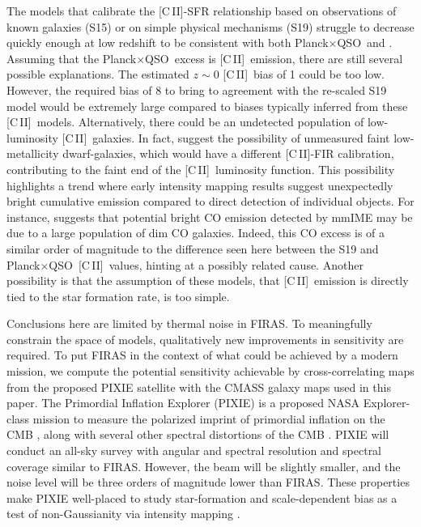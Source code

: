 \documentclass[fleqn,usenatbib]{mnras}
\newcommand{\cii}{[C{\sc\,II}]}
\newcommand{\PB}{Planck${\times}$QSO}
\begin{document}
The models that calibrate the \cii-SFR relationship based on observations of known galaxies (S15) or on simple physical mechanisms (S19) struggle to decrease quickly enough at low redshift to be consistent with both \PB\ and \cite{2017ApJ...834...36H}. Assuming that the \PB\ excess is \cii\ emission, there are still several possible explanations. The estimated $z {\sim} 0$ \cii\ bias of 1 could be too low. However, the required bias of 8 to bring \cite{2017ApJ...834...36H} to agreement with the re-scaled S19 model would be extremely large compared to biases typically inferred from these \cii\ models. Alternatively, there could be an undetected population of low-luminosity \cii\ galaxies. In fact, \cite{2017ApJ...834...36H} suggest the possibility of unmeasured faint low-metallicity dwarf-galaxies, which would have a different \cii-FIR calibration, contributing to the faint end of the \cii\ luminosity function. This possibility highlights a trend where early intensity mapping results suggest unexpectedly bright cumulative emission compared to direct detection of individual objects. For instance, \cite{2021arXiv210614904B} suggests that potential bright CO emission detected by mmIME \citep{Keating_2020} may be due to a large population of dim CO galaxies. Indeed, this CO excess is of a similar order of magnitude to the difference seen here between the S19 and \PB\ \cii\ values, hinting at a possibly related cause. Another possibility is that the assumption of these models, that \cii\ emission is directly tied to the star formation rate, is too simple.

Conclusions here are limited by thermal noise in FIRAS. To meaningfully constrain the space of models, qualitatively new improvements in sensitivity are required. To put FIRAS in the context of what could be achieved by a modern mission, we compute the potential sensitivity achievable by cross-correlating maps from the proposed PIXIE satellite with the CMASS galaxy maps used in this paper. The Primordial Inflation Explorer (PIXIE) is a proposed NASA Explorer-class mission to measure the polarized imprint of primordial inflation on the CMB \citep{kogut2011primordial}, along with several other spectral distortions of the CMB \citep{chluba2021new}. PIXIE will conduct an all-sky survey with angular and spectral resolution and spectral coverage similar to FIRAS. However, the beam will be slightly smaller, and the noise level will be three orders of magnitude lower than FIRAS. These properties make PIXIE well-placed to study star-formation and scale-dependent bias as a test of non-Gaussianity via intensity mapping \citep{dizgah2019probing, switzer2017tracing}. 
\end{document}
